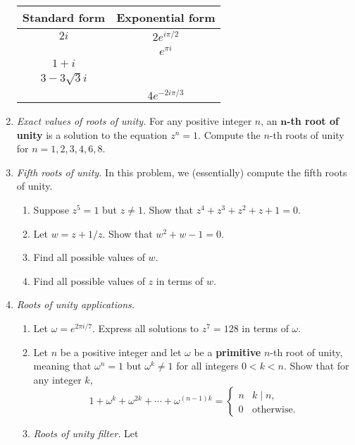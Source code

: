 \begin{enumerate}
\begin{center}
\setlength{\tabcolsep}{10pt}
\renewcommand{\arraystretch}{1.5}
\begin{tabular}{|c|c|} \hline
Standard form & Exponential form \\ \hline
$2i$ & $2e^{i\pi/2}$ \\ \hline
{} & $e^{\pi i}$ \\ \hline
$1 + i$ & {} \\ \hline
$3 - 3\sqrt{3}i$ & {} \\ \hline
{} & $4e^{-2i\pi/3}$ \\ \hline
\end{tabular}
\endgroup
\end{center}
\item \emph{Exact values of roots of unity.} For any positive integer $n$, an $\boldsymbol n$\textbf{-th root of unity} is a solution to the equation $z^n = 1$. Compute the $n$-th roots of unity for $n = 1, 2, 3, 4, 6, 8$.
\item \emph{Fifth roots of unity.} In this problem, we (essentially) compute the fifth roots of unity.
\begin{enumerate}
\item Suppose $z^5 = 1$ but $z\neq 1$. Show that $z^4 + z^3 + z^2 + z + 1 = 0$.
\item Let $w = z + 1/z$. Show that $w^2 + w - 1 = 0$.
\item Find all possible values of $w$.
\item Find all possible values of $z$ in terms of $w$.
\end{enumerate}
\item \emph{Roots of unity applications.}
\begin{enumerate}
\item Let $\omega = e^{2\pi i/7}$. Express all solutions to $z^7 = 128$ in terms of $\omega$.
\item Let $n$ be a positive integer and let $\omega$ be a \textbf{primitive} $n$-th root of unity, meaning that $\omega^n = 1$ but $\omega^k\neq 1$ for all integers $0 < k < n$. Show that for any integer $k$,
\begin{equation*}
1 + \omega^k + \omega^{2k} + \cdots + \omega^{(n - 1)k} = \begin{cases} n & k\mid n, \\ 0 & \text{otherwise}. \end{cases}
\end{equation*}
\item \textit{Roots of unity filter.} Let
\begin{equation*}

\end{equation*}
\end{enumerate}
\end{enumerate}
